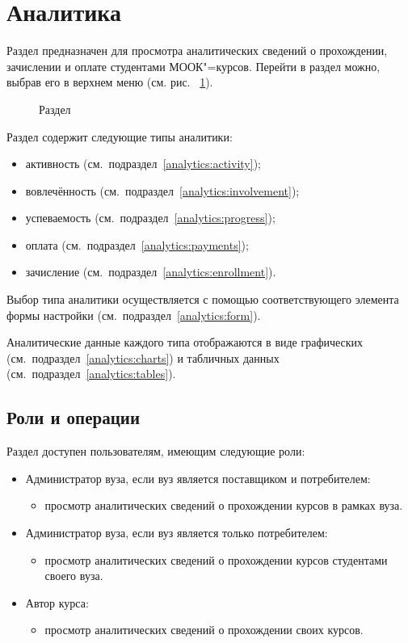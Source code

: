 \graphicspath{{images/analytics/}}
\section{Аналитика}

Раздел  предназначен для просмотра аналитических сведений о прохождении, 
зачислении и оплате студентами МООК"=курсов. 
Перейти в раздел можно, выбрав его в верхнем меню (см. рис. ~\ref{analytics:top_menu}).

\begin{figure}[H]
	\caption{Раздел }
	\label{analytics:top_menu}
\end{figure}


Раздел  содержит следующие типы аналитики:
\begin{itemize}
	\item активность (см.\ подраздел~\ref{analytics:activity});
	\item вовлечённость (см.\ подраздел~\ref{analytics:involvement});
	\item успеваемость (см.\ подраздел~\ref{analytics:progress});
	\item оплата (см.\ подраздел~\ref{analytics:payments});
	\item зачисление (см.\ подраздел~\ref{analytics:enrollment}).
\end{itemize}

Выбор типа аналитики осуществляется с помощью соответствующего элемента формы настройки 
(см.\ подраздел~\ref{analytics:form}).

Аналитические данные каждого типа отображаются в виде графических 
(см.\ подраздел~\ref{analytics:charts}) и табличных данных (см.\ подраздел~\ref{analytics:tables}). 

\subsection{Роли и операции}
Раздел доступен пользователям, имеющим следующие роли:
\begin{itemize}
	\item Администратор вуза, если вуз является поставщиком и потребителем:
	\begin{itemize}
		\item просмотр аналитических сведений о прохождении курсов в рамках вуза.
	\end{itemize}
	\item Администратор вуза, если вуз является только потребителем:
	\begin{itemize}
		\item просмотр аналитических сведений о прохождении курсов студентами своего вуза.
	\end{itemize}
	\item Автор курса:
	\begin{itemize}
		\item просмотр аналитических сведений о прохождении своих курсов.
	\end{itemize}
\end{itemize}

